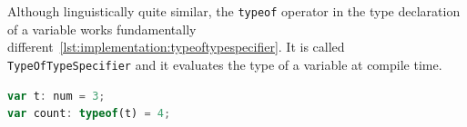 Although linguistically quite similar, the \lstinline|typeof| operator in the type declaration of a variable works fundamentally different~\ref{lst:implementation:typeoftypespecifier}. It is called \lstinline|TypeOfTypeSpecifier| and it evaluates the type of a variable at compile time.

\begin{lstlisting}[language=Typescript,caption=Specifying the type based on a reference variable, label=lst:implementation:typeoftypespecifier]
var t: num = 3;
var count: typeof(t) = 4;
\end{lstlisting}

